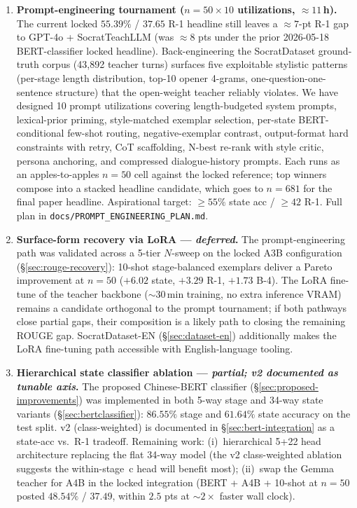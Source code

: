 \documentclass[11pt]{article}
\begin{document}
\begin{enumerate}
    \item \textbf{Prompt-engineering tournament ($n{=}50 \times 10$ utilizations, $\approx 11$\,h).} The current locked $55.39\%$ / $37.65$ R-1 headline still leaves a $\approx 7$-pt R-1 gap to GPT-4o + SocratTeachLLM (was $\approx 8$ pts under the prior 2026-05-18 BERT-classifier locked headline). Back-engineering the SocratDataset ground-truth corpus (43{,}892 teacher turns) surfaces five exploitable stylistic patterns (per-stage length distribution, top-10 opener 4-grams, one-question-one-sentence structure) that the open-weight teacher reliably violates. We have designed 10 prompt utilizations covering length-budgeted system prompts, lexical-prior priming, style-matched exemplar selection, per-state BERT-conditional few-shot routing, negative-exemplar contrast, output-format hard constraints with retry, CoT scaffolding, N-best re-rank with style critic, persona anchoring, and compressed dialogue-history prompts. Each runs as an apples-to-apples $n{=}50$ cell against the locked reference; top winners compose into a stacked headline candidate, which goes to $n{=}681$ for the final paper headline. Aspirational target: $\geq 55\%$ state acc / $\geq 42$ R-1. Full plan in \texttt{docs/PROMPT\_ENGINEERING\_PLAN.md}.
    \item \textbf{Surface-form recovery via LoRA --- \emph{deferred}.} The prompt-engineering path was validated across a 5-tier $N$-sweep on the locked A3B configuration (\S\ref{sec:rouge-recovery}): 10-shot stage-balanced exemplars deliver a Pareto improvement at $n{=}50$ ($+6.02$ state, $+3.29$ R-1, $+1.73$ B-4). The LoRA fine-tune of the teacher backbone ($\sim 30$\,min training, no extra inference VRAM) remains a candidate orthogonal to the prompt tournament; if both pathways close partial gaps, their composition is a likely path to closing the remaining ROUGE gap. SocratDataset-EN (\S\ref{sec:dataset-en}) additionally makes the LoRA fine-tuning path accessible with English-language tooling.
    \item \textbf{Hierarchical state classifier ablation --- \emph{partial; v2 documented as tunable axis}.} The proposed Chinese-BERT classifier (\S\ref{sec:proposed-improvements}) was implemented in both 5-way stage and 34-way state variants (\S\ref{sec:bertclassifier}): $86.55\%$ stage and $61.64\%$ state accuracy on the test split. v2 (class-weighted) is documented in \S\ref{sec:bert-integration} as a state-acc vs.\ R-1 tradeoff. Remaining work: (i)~hierarchical 5+22 head architecture replacing the flat 34-way model (the v2 class-weighted ablation suggests the within-stage~c head will benefit most); (ii)~swap the Gemma teacher for A4B in the locked integration (BERT + A4B + 10-shot at $n{=}50$ posted $48.54\%$ / $37.49$, within $2.5$ pts at $\sim 2\times$ faster wall clock).

\end{enumerate}
\end{document}
